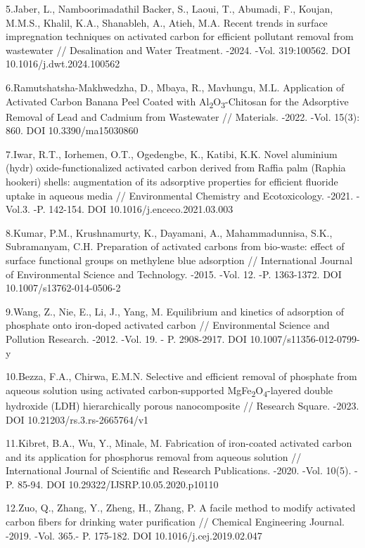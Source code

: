 5.Jaber, L., Namboorimadathil Backer, S., Laoui, T., Abumadi, F.,
Koujan, M.M.S., Khalil, K.A., Shanableh, A., Atieh, M.A. Recent trends
in surface impregnation techniques on activated carbon for efficient
pollutant removal from wastewater // Desalination and Water Treatment.
-2024. -Vol. 319:100562. DOI 10.1016/j.dwt.2024.100562

6.Ramutshatsha-Makhwedzha, D., Mbaya, R., Mavhungu, M.L. Application of
Activated Carbon Banana Peel Coated with
Al\textsubscript{2}O\textsubscript{3}-Chitosan for the Adsorptive
Removal of Lead and Cadmium from Wastewater // Materials. -2022. -Vol.
15(3): 860. DOI 10.3390/ma15030860

7.Iwar, R.T., Iorhemen, O.T., Ogedengbe, K., Katibi, K.K. Novel
aluminium (hydr) oxide-functionalized activated carbon derived from
Raffia palm (Raphia hookeri) shells: augmentation of its adsorptive
properties for efficient fluoride uptake in aqueous media //
Environmental Chemistry and Ecotoxicology. -2021. -Vol.3. -P. 142-154.
DOI 10.1016/j.enceco.2021.03.003

8.Kumar, P.M., Krushnamurty, K., Dayamani, A., Mahammadunnisa, S.K.,
Subramanyam, C.H. Preparation of activated carbons from bio-waste:
effect of surface functional groups on methylene blue adsorption //
International Journal of Environmental Science and Technology. -2015.
-Vol. 12. -P. 1363-1372. DOI 10.1007/s13762-014-0506-2

9.Wang, Z., Nie, E., Li, J., Yang, M. Equilibrium and kinetics of
adsorption of phosphate onto iron-doped activated carbon //
Environmental Science and Pollution Research. -2012. -Vol. 19. - P.
2908-2917. DOI 10.1007/s11356-012-0799-y

10.Bezza, F.A., Chirwa, E.M.N. Selective and efficient removal of
phosphate from aqueous solution using activated carbon-supported
MgFe\textsubscript{2}O\textsubscript{4}-layered double hydroxide (LDH)
hierarchically porous nanocomposite // Research Square. -2023. DOI
10.21203/rs.3.rs-2665764/v1

11.Kibret, B.A., Wu, Y., Minale, M. Fabrication of iron-coated activated
carbon and its application for phosphorus removal from aqueous solution
// International Journal of Scientific and Research Publications. -2020.
-Vol. 10(5). -P. 85-94. DOI 10.29322/IJSRP.10.05.2020.p10110

12.Zuo, Q., Zhang, Y., Zheng, H., Zhang, P. A facile method to modify
activated carbon fibers for drinking water purification // Chemical
Engineering Journal. -2019. -Vol. 365.- P. 175-182. DOI
10.1016/j.cej.2019.02.047

